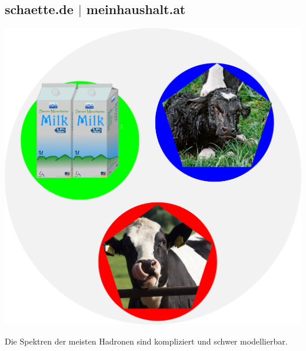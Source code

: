 \appendix


\subsection{schaette.de $|$ meinhaushalt.at}
\begin{frame}
\begin{minipage}{0.6\textwidth}
\includegraphics[width=\textwidth]{Figures Lecture on Hadrons/Hadron_with_pictures.png}
\end{minipage}
\begin{minipage}{0.38\textwidth}
Die Spektren der meisten Hadronen sind kompliziert und schwer modellierbar.
\end{minipage}

\end{frame}
\subsection{}
